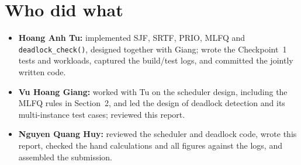 \documentclass[10pt,a4paper]{article}
\newcommand{\code}[1]{\texttt{#1}}
\begin{document}
\section{Who did what}
\begin{itemize}
\item \textbf{Hoang Anh Tu:} implemented SJF, SRTF, PRIO, MLFQ and \code{deadlock\_check()}, designed together with Giang; wrote the Checkpoint~1 tests and workloads, captured the build/test logs, and committed the jointly written code.
\item \textbf{Vu Hoang Giang:} worked with Tu on the scheduler design, including the MLFQ rules in Section~2, and led the design of deadlock detection and its multi-instance test cases; reviewed this report.
\item \textbf{Nguyen Quang Huy:} reviewed the scheduler and deadlock code, wrote this report, checked the hand calculations and all figures against the logs, and assembled the submission.
\end{itemize}
\end{document}

